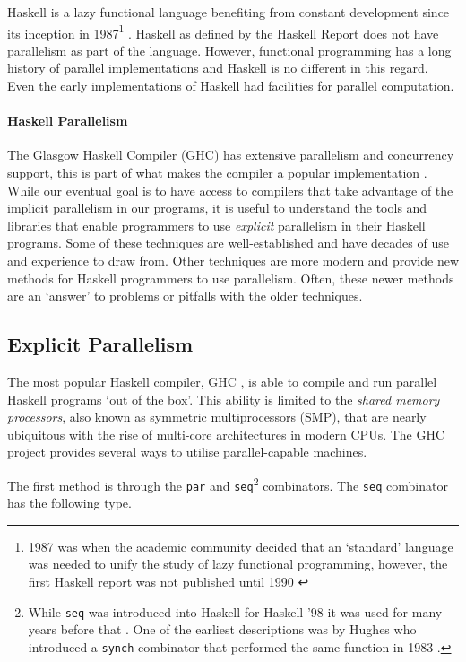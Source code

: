 Haskell is a lazy functional language benefiting from constant development
since its inception in 1987\footnote{1987 was when the academic community
decided that an `standard' language was needed to unify the study of lazy
functional programming\citep{HistoryOfHaskell}, however, the first Haskell
report was not published until 1990 \citep{Haskell98Book}}
\citep{HistoryOfHaskell, Haskell98Book}. Haskell as defined by the Haskell
Report \citep{haskellReport} does not have parallelism as part of the language.
However, functional programming has a long history of parallel implementations
and Haskell is no different in this regard. Even the early implementations of
Haskell had facilities for parallel computation.

\paragraph{Haskell Parallelism}

The Glasgow Haskell Compiler (GHC) has extensive parallelism and concurrency
support, this is part of what makes the compiler a popular implementation
\citep{HistoryOfHaskell}. While our eventual goal is to have access to
compilers that take advantage of the implicit parallelism in our programs, it
is useful to understand the tools and libraries that enable programmers to use
\emph{explicit} parallelism in their Haskell programs. Some of these techniques
are well-established and have decades of use and experience to draw from. Other
techniques are more modern and provide new methods for Haskell programmers to
use parallelism. Often, these newer methods are an `answer' to problems or
pitfalls with the older techniques.

 \subsection{Explicit Parallelism}

The most popular Haskell compiler, GHC \citep{HistoryOfHaskell}, is able to
compile and run parallel Haskell programs `out of the box'. This ability is
limited to the \emph{shared memory processors}, also known as symmetric
multiprocessors (SMP), that are nearly ubiquitous with the rise of multi-core
architectures in modern CPUs. The GHC project provides several ways to utilise
parallel-capable machines.

The first method is through the \verb=par= and \verb=seq=\footnote{While
\texttt{seq} was introduced into Haskell for Haskell '98 \citep{Haskell98Book}
it was used for many years before that \citep{HistoryOfHaskell}. One of the
earliest descriptions was by Hughes who introduced a \texttt{synch} combinator
that performed the same function in 1983 \citep{hughes:thesis}.} combinators.
The \verb=seq= combinator has the following type.

